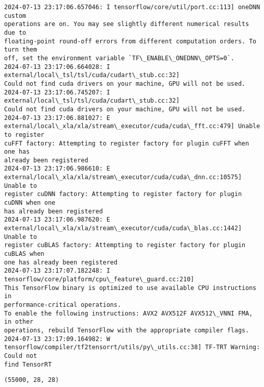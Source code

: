 \documentclass[12pt letter]{report}
\makeatletter
\newcommand{\boxspacing}{\kern\kvtcb@left@rule\kern\kvtcb@boxsep}
\newcommand{\prompt}[4]{
        {\ttfamily\llap{{\color{#2}[#3]:\hspace{3pt}#4}}\vspace{-\baselineskip}}
    }
\makeatother
\begin{document}
    \begin{Verbatim}[commandchars=\\\{\}]
2024-07-13 23:17:06.657046: I tensorflow/core/util/port.cc:113] oneDNN custom
operations are on. You may see slightly different numerical results due to
floating-point round-off errors from different computation orders. To turn them
off, set the environment variable `TF\_ENABLE\_ONEDNN\_OPTS=0`.
2024-07-13 23:17:06.664028: I external/local\_tsl/tsl/cuda/cudart\_stub.cc:32]
Could not find cuda drivers on your machine, GPU will not be used.
2024-07-13 23:17:06.745207: I external/local\_tsl/tsl/cuda/cudart\_stub.cc:32]
Could not find cuda drivers on your machine, GPU will not be used.
2024-07-13 23:17:06.881027: E
external/local\_xla/xla/stream\_executor/cuda/cuda\_fft.cc:479] Unable to register
cuFFT factory: Attempting to register factory for plugin cuFFT when one has
already been registered
2024-07-13 23:17:06.986610: E
external/local\_xla/xla/stream\_executor/cuda/cuda\_dnn.cc:10575] Unable to
register cuDNN factory: Attempting to register factory for plugin cuDNN when one
has already been registered
2024-07-13 23:17:06.987620: E
external/local\_xla/xla/stream\_executor/cuda/cuda\_blas.cc:1442] Unable to
register cuBLAS factory: Attempting to register factory for plugin cuBLAS when
one has already been registered
2024-07-13 23:17:07.182248: I tensorflow/core/platform/cpu\_feature\_guard.cc:210]
This TensorFlow binary is optimized to use available CPU instructions in
performance-critical operations.
To enable the following instructions: AVX2 AVX512F AVX512\_VNNI FMA, in other
operations, rebuild TensorFlow with the appropriate compiler flags.
2024-07-13 23:17:09.164982: W
tensorflow/compiler/tf2tensorrt/utils/py\_utils.cc:38] TF-TRT Warning: Could not
find TensorRT
    \end{Verbatim}

            \begin{tcolorbox}[breakable, size=fbox, boxrule=.5pt, pad at break*=1mm, opacityfill=0]
\prompt{Out}{outcolor}{7}{\boxspacing}
\begin{Verbatim}[commandchars=\\\{\}]
(55000, 28, 28)
\end{Verbatim}
\end{tcolorbox}
        
\end{document}
